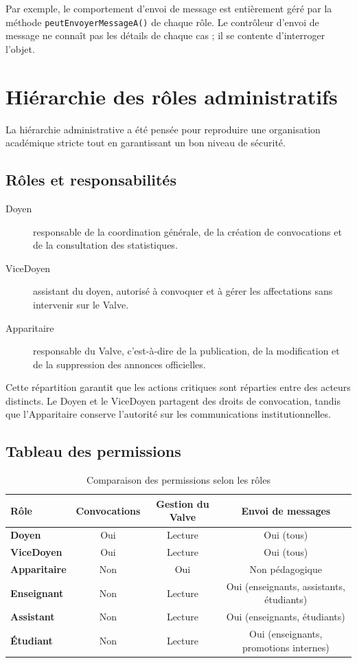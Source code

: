 \documentclass[12pt,a4paper]{article}
\begin{document}
Par exemple, le comportement d'envoi de message est entièrement géré par la méthode \texttt{peutEnvoyerMessageA()} de chaque rôle. Le contrôleur d'envoi de message ne connaît pas les détails de chaque cas ; il se contente d'interroger l'objet.

\section{Hiérarchie des rôles administratifs}
La hiérarchie administrative a été pensée pour reproduire une organisation académique stricte tout en garantissant un bon niveau de sécurité.

\subsection{Rôles et responsabilités}
\begin{description}
  \item[Doyen] responsable de la coordination générale, de la création de convocations et de la consultation des statistiques.
  \item[ViceDoyen] assistant du doyen, autorisé à convoquer et à gérer les affectations sans intervenir sur le Valve.
  \item[Apparitaire] responsable du Valve, c'est-à-dire de la publication, de la modification et de la suppression des annonces officielles.
\end{description}

Cette répartition garantit que les actions critiques sont réparties entre des acteurs distincts. Le Doyen et le ViceDoyen partagent des droits de convocation, tandis que l'Apparitaire conserve l'autorité sur les communications institutionnelles.

\subsection{Tableau des permissions}
\begin{table}[h]
\centering
\begin{tabular}{|>{\bfseries}l|c|c|c|}
\hline
Rôle & Convocations & Gestion du Valve & Envoi de messages \\
\hline
Doyen & Oui & Lecture & Oui (tous) \\
\hline
ViceDoyen & Oui & Lecture & Oui (tous) \\
\hline
Apparitaire & Non & Oui & Non pédagogique \\
\hline
Enseignant & Non & Lecture & Oui (enseignants, assistants, étudiants) \\
\hline
Assistant & Non & Lecture & Oui (enseignants, étudiants) \\
\hline
Étudiant & Non & Lecture & Oui (enseignants, promotions internes) \\
\hline
\end{tabular}
\caption{Comparaison des permissions selon les rôles}
\end{table}
\end{document}
